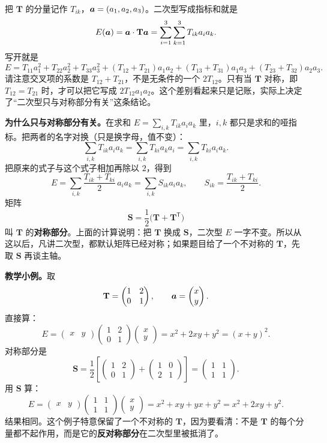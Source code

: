 \documentclass[11pt]{ctexart}
\newcommand{\ten}[1]{\mathbf{#1}}
\let\origsubhdr\subhdr
\renewcommand{\subhdr}[1]{\par\needspace{3\baselineskip}\origsubhdr{#1}}
\begin{document}
\label{subsec:quadratic-sym}

把 $\ten T$ 的分量记作 $T_{ik}$，$\boldsymbol{a}=(a_1,a_2,a_3)$。二次型写成指标和就是
\[
E(\vect a)=\vect a\cdot\ten T\vect a
=\sum_{i=1}^{3}\sum_{k=1}^{3}T_{ik}a_ia_k .
\]
写开就是
\[
E=T_{11}a_1^2+T_{22}a_2^2+T_{33}a_3^2
+(T_{12}+T_{21})a_1a_2
+(T_{13}+T_{31})a_1a_3
+(T_{23}+T_{32})a_2a_3 .
\]
请注意交叉项的系数是 $T_{12}+T_{21}$，不是无条件的一个 $2T_{12}$。只有当 $\ten T$ 对称，即 $T_{12}=T_{21}$ 时，才可以把它写成 $2T_{12}a_1a_2$。这个差别看起来只是记账，实际上决定了“二次型只与对称部分有关”这条结论。

\textbf{为什么只与对称部分有关。}在求和 $E=\sum_{i,k}T_{ik}a_ia_k$ 里，$i,k$ 都只是求和的哑指标。把两者的名字对换（只是换字母，值不变）：
\[
\sum_{i,k}T_{ik}a_ia_k
=\sum_{i,k}T_{ki}a_ka_i
=\sum_{i,k}T_{ki}a_ia_k .
\]
把原来的式子与这个式子相加再除以 $2$，得到
\[
E=\sum_{i,k}\frac{T_{ik}+T_{ki}}{2}\,a_ia_k
=\sum_{i,k}S_{ik}a_ia_k,
\qquad
S_{ik}=\frac{T_{ik}+T_{ki}}{2}.
\]
矩阵
\[
\ten S=\frac12\bigl(\ten T+\ten T^{\mathsf T}\bigr)
\]
叫 $\ten T$ 的\textbf{对称部分}。上面的计算说明：把 $\ten T$ 换成 $\ten S$，二次型 $E$ 一字不变。所以从这以后，凡讲二次型，都默认矩阵已经对称；如果题目给了一个不对称的 $\ten T$，先取 $\ten S$ 再谈主轴。

\textbf{教学小例。}取
\[
\ten T=\begin{pmatrix}1&2\\0&1\end{pmatrix},
\qquad
\vect a=\begin{pmatrix}x\\y\end{pmatrix}.
\]
直接算：
\[
E=\begin{pmatrix}x&y\end{pmatrix}
\begin{pmatrix}1&2\\0&1\end{pmatrix}
\begin{pmatrix}x\\y\end{pmatrix}
=x^2+2xy+y^2=(x+y)^2 .
\]
对称部分是
\[
\ten S=\frac12\left[
\begin{pmatrix}1&2\\0&1\end{pmatrix}
+\begin{pmatrix}1&0\\2&1\end{pmatrix}\right]
=\begin{pmatrix}1&1\\1&1\end{pmatrix}.
\]
用 $\ten S$ 算：
\[
E=\begin{pmatrix}x&y\end{pmatrix}
\begin{pmatrix}1&1\\1&1\end{pmatrix}
\begin{pmatrix}x\\y\end{pmatrix}
=x^2+xy+yx+y^2=x^2+2xy+y^2 .
\]
结果相同。这个例子特意保留了一个不对称的 $\ten T$，因为要看清：不是 $\ten T$ 的每个分量都不起作用，而是它的\textbf{反对称部分}在二次型里被抵消了。
\end{document}
